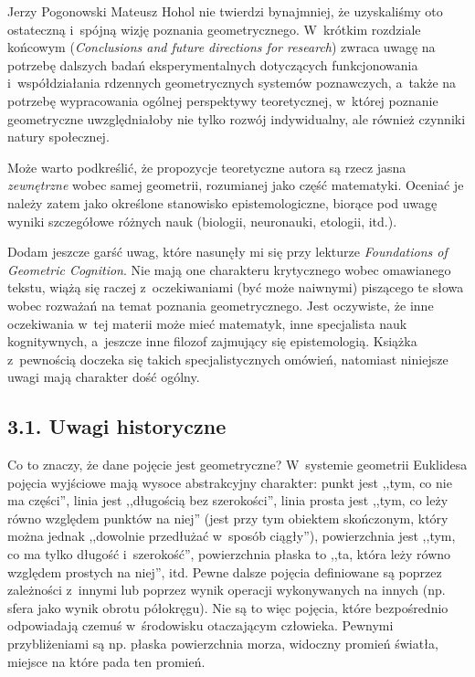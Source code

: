 \begin{newrevplenv}{Jerzy Pogonowski}
Mateusz Hohol nie twierdzi bynajmniej, że uzyskaliśmy oto
ostateczną i~spójną wizję poznania geometrycznego. W~krótkim
rozdziale końcowym ({\em Conclusions and future directions for
research}) zwraca uwagę na potrzebę dalszych badań
eksperymentalnych dotyczących funkcjonowania i~współdziałania
rdzennych geometrycznych systemów poznawczych, a~także na potrzebę
wypracowania ogólnej perspektywy teoretycznej, w~której poznanie
geometryczne uwzględniałoby nie tylko rozwój indywidualny, ale
również czynniki natury społecznej.

Może warto podkreślić, że propozycje teoretyczne autora są rzecz
jasna {\em zewnętrzne} wobec samej geometrii, rozumianej jako
część matematyki. Oceniać je należy zatem jako określone
stanowisko epistemologiczne, biorące pod uwagę wyniki szczegółowe
różnych nauk (biologii, neuronauki, etologii, itd.).

Dodam jeszcze garść uwag, które nasunęły mi się przy lekturze {\em
Foundations of Geometric Cognition}. Nie mają one charakteru
krytycznego wobec omawianego tekstu, wiążą się raczej z~oczekiwaniami (być może naiwnymi) piszącego te słowa wobec
rozważań na temat poznania geometrycznego. Jest oczywiste, że inne
oczekiwania w~tej materii może mieć matematyk, inne specjalista
nauk kognitywnych, a~jeszcze inne filozof zajmujący się
epistemologią. Książka z~pewnością doczeka się takich
specjalistycznych omówień, natomiast niniejsze uwagi mają
charakter dość ogólny.

\subsection{3.1. Uwagi historyczne}

Co to znaczy, że dane pojęcie jest geometryczne? W~systemie
geometrii Euklidesa pojęcia wyjściowe mają wysoce abstrakcyjny
charakter: punkt jest ,,tym, co nie ma części'', linia jest
,,długością bez szerokości'', linia prosta jest ,,tym, co leży
równo względem punktów na niej'' (jest przy tym obiektem
skończonym, który można jednak ,,dowolnie przedłużać w~sposób
ciągły''), powierzchnia jest ,,tym, co ma tylko długość i~szerokość'', powierzchnia płaska to ,,ta, która leży równo
względem prostych na niej'', itd. Pewne dalsze pojęcia definiowane
są poprzez zależności z~innymi lub poprzez wynik operacji
wykonywanych na innych (np. sfera jako wynik obrotu półokręgu).
Nie są to więc pojęcia, które bezpośrednio odpowiadają czemuś w~środowisku otaczającym człowieka. Pewnymi przybliżeniami są np.
płaska powierzchnia morza, widoczny promień światła, miejsce na
które pada ten promień.


\end{newrevplenv}
